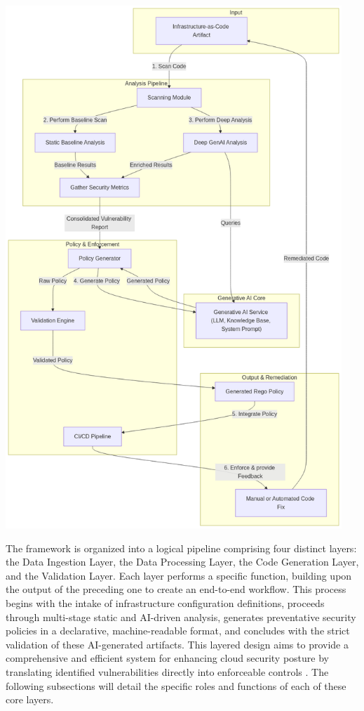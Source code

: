 \begin{center}
    \includegraphics[width=0.95\textwidth]{Figures/conceptual.png}
    \label{fig:prototype-architecture}
\end{center}

The framework is organized into a logical pipeline comprising four distinct layers: the Data Ingestion Layer, the Data Processing Layer, the Code Generation Layer, and the Validation Layer. Each layer performs a specific function, building upon the output of the preceding one to create an end-to-end workflow. This process begins with the intake of infrastructure configuration definitions, proceeds through multi-stage static and AI-driven analysis, generates preventative security policies in a declarative, machine-readable format, and concludes with the strict validation of these AI-generated artifacts. This layered design aims to provide a comprehensive and efficient system for enhancing cloud security posture by translating identified vulnerabilities directly into enforceable controls \cite{fakih_llm4cve_2025}. The following subsections will detail the specific roles and functions of each of these core layers.

